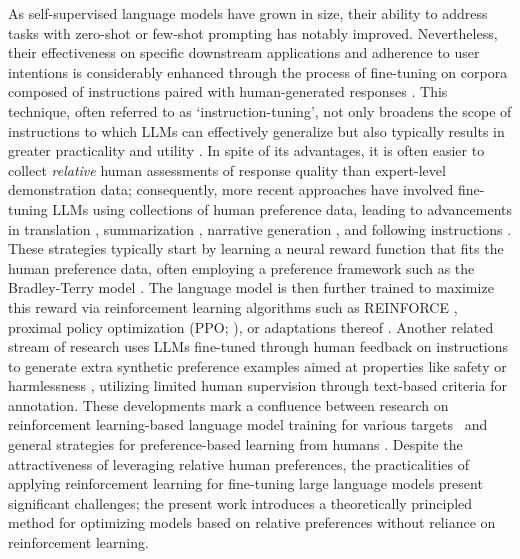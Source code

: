 As self-supervised language models have grown in size, their ability to address tasks with zero-shot \citep{radford2019language} or few-shot prompting \citep{gpt3,megatron,chowdhery2022palm} has notably improved. Nevertheless, their effectiveness on specific downstream applications and adherence to user intentions is considerably enhanced through the process of fine-tuning on corpora composed of instructions paired with human-generated responses \citep{mishra-etal-2022-cross,sanh2022multitask,chung2022scaling,thoppilan2022lamda}. This technique, often referred to as `instruction-tuning', not only broadens the scope of instructions to which LLMs can effectively generalize but also typically results in greater practicality and utility \citep{chung2022scaling}. In spite of its advantages, it is often easier to collect \textit{relative} human assessments of response quality than expert-level demonstration data; consequently, more recent approaches have involved fine-tuning LLMs using collections of human preference data, leading to advancements in translation \citep{kreutzer-etal-2018-reliability}, summarization \citep{stiennon2022learning,ziegler2020finetuning}, narrative generation \citep{ziegler2020finetuning}, and following instructions \citep{ouyang2022training,ramamurthy2023is}. These strategies typically start by learning a neural reward function that fits the human preference data, often employing a preference framework such as the Bradley-Terry model \citep{bradley1952rankanalysis}. The language model is then further trained to maximize this reward via reinforcement learning algorithms such as REINFORCE \citep{williams1992reinforce}, proximal policy optimization (PPO; \cite{schulman2017proximal}), or adaptations thereof \citep{ramamurthy2023is}. Another related stream of research uses LLMs fine-tuned through human feedback on instructions to generate extra synthetic preference examples aimed at properties like safety or harmlessness \citep{bai2022constitutional}, utilizing limited human supervision through text-based criteria for annotation. These developments mark a confluence between research on reinforcement learning-based language model training for various targets~\citep{Ranzato2015SequenceLT,paulus2018a,wu2018learning} and general strategies for preference-based learning from humans \citep{christiano2017deep,kupcsik2018learning}. Despite the attractiveness of leveraging relative human preferences, the practicalities of applying reinforcement learning for fine-tuning large language models present significant challenges; the present work introduces a theoretically principled method for optimizing models based on relative preferences without reliance on reinforcement learning.

